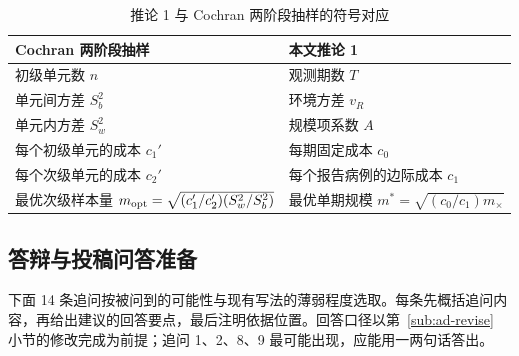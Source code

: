 \begin{table}[!tbp]
\centering
\small
\caption{推论 1 与 Cochran 两阶段抽样的符号对应}
\label{tab:ad-cochran}
\begin{tabular}{L{6.2cm}L{6.2cm}}
\toprule
Cochran 两阶段抽样 & 本文推论 1 \\
\midrule
初级单元数 $n$ & 观测期数 $T$ \\
单元间方差 $S_b^2$ & 环境方差 $v_R$ \\
单元内方差 $S_w^2$ & 规模项系数 $A$ \\
每个初级单元的成本 $c_1'$ & 每期固定成本 $c_0$ \\
每个次级单元的成本 $c_2'$ & 每个报告病例的边际成本 $c_1$ \\
最优次级样本量 $m_{\rm opt}=\sqrt{(c_1'/c_2')(S_w^2/S_b^2)}$ & 最优单期规模 $m^*=\sqrt{(c_0/c_1)m_\times}$ \\
\bottomrule
\end{tabular}
\end{table}

\subsection{答辩与投稿问答准备}\label{sub:ad-qa}

下面 14 条追问按被问到的可能性与现有写法的薄弱程度选取。每条先概括追问内容，再给出建议的回答要点，最后注明依据位置。回答口径以第~\ref{sub:ad-revise} 小节的修改完成为前提；追问 1、2、8、9 最可能出现，应能用一两句话答出。


